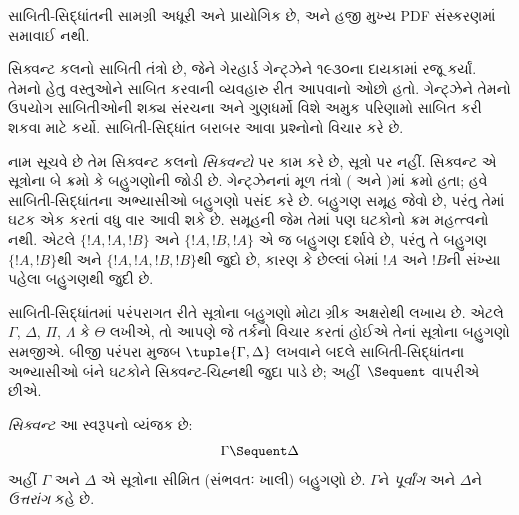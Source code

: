 
\label{guunit:OLP-0685}


\begin{editorial}
  સાબિતી-સિદ્ધાંતની સામગ્રી અધૂરી અને પ્રાયોગિક છે,
  અને હજી મુખ્ય PDF સંસ્કરણમાં સમાવાઈ નથી.
\end{editorial}

\begingroup
\makeatletter{}\makeatother

\label{guunit:OLP-0712}


\begingroup
\makeatletter{}\makeatother


\label{guunit:OLP-0700}


સિક્વન્ટ કલનો સાબિતી તંત્રો છે,
જેને ગેરહાર્ડ ગેન્ટ્ઝેને ૧૯૩૦ના દાયકામાં રજૂ કર્યાં.
તેમનો હેતુ વસ્તુઓને સાબિત કરવાની વ્યવહારુ રીત આપવાનો ઓછો હતો.
ગેન્ટ્ઝેને તેમનો ઉપયોગ સાબિતીઓની શક્ય સંરચના
અને ગુણધર્મો વિશે અમુક પરિણામો સાબિત કરી શકવા માટે કર્યો.
સાબિતી-સિદ્ધાંત બરાબર આવા પ્રશ્નોનો વિચાર કરે છે.

નામ સૂચવે છે તેમ સિક્વન્ટ કલનો \emph{સિક્વન્ટો} પર કામ કરે છે,
સૂત્રો પર નહીં.
સિક્વન્ટ એ સૂત્રોના બે ક્રમો કે બહુગણોની જોડી છે.
ગેન્ટ્ઝેનનાં મૂળ તંત્રો ( અને )માં ક્રમો હતા;
હવે સાબિતી-સિદ્ધાંતના અભ્યાસીઓ બહુગણો પસંદ કરે છે.
બહુગણ સમૂહ જેવો છે, પરંતુ તેમાં ઘટક
એક કરતાં વધુ વાર આવી શકે છે.
સમૂહની જેમ તેમાં પણ ઘટકોનો ક્રમ મહત્ત્વનો નથી.
એટલે $\{!A, !A, !B\}$ અને $\{!A, !B, !A\}$
એ જ બહુગણ દર્શાવે છે,
પરંતુ તે બહુગણ $\{!A, !B\}$થી અને $\{!A, !A, !B, !B\}$થી જુદો છે,
કારણ કે છેલ્લાં બેમાં $!A$ અને $!B$ની સંખ્યા પહેલા બહુગણથી જુદી છે.

સાબિતી-સિદ્ધાંતમાં પરંપરાગત રીતે સૂત્રોના બહુગણો
મોટા ગ્રીક અક્ષરોથી લખાય છે.
એટલે $\Gamma$, $\Delta$, $\Pi$, $\Lambda$ કે $\Theta$ લખીએ,
તો આપણે જે તર્કનો વિચાર કરતાં હોઈએ તેનાં સૂત્રોના બહુગણો સમજીએ.
બીજી પરંપરા મુજબ $\tuple{\Gamma, \Delta}$ લખવાને બદલે
સાબિતી-સિદ્ધાંતના અભ્યાસીઓ બંને ઘટકોને સિક્વન્ટ-ચિહ્નથી જુદા પાડે છે;
અહીં~$\Sequent$ વાપરીએ છીએ.

\begin{defn}[સિક્વન્ટ]
\emph{સિક્વન્ટ} આ સ્વરૂપનો વ્યંજક છે:
\[
\Gamma \Sequent \Delta
\]
અહીં $\Gamma$ અને $\Delta$ એ સૂત્રોના સીમિત
(સંભવતઃ ખાલી) બહુગણો છે.
$\Gamma$ને \emph{પૂર્વાંગ} અને $\Delta$ને \emph{ઉત્તરાંગ} કહે છે.
\end{defn}

